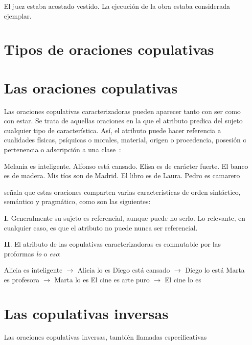 \pex[*]
\a	El juez estaba acostado vestido.
\a	La ejecución de la obra estaba considerada ejemplar.
\xe

\section{Tipos de oraciones copulativas}


\section{Las oraciones copulativas}

Las oraciones copulativas caracterizadoras pueden aparecer tanto con ser como con estar. Se trata de aquellas oraciones en la que el atributo predica del sujeto cualquier tipo de característica. Así, el atributo puede hacer referencia a cualidades físicas, psíquicas o morales, material, origen o procedencia, posesión o pertenencia o adscripción a una clase~\parencites[][]{Leborans1999Predicacion}[][]{Bentley20179Copular-and-}:

\pex
\a Melania es inteligente.
\a Alfonso está cansado.
\a Elisa es de carácter fuerte.
\a El banco es de madera.
\a Mis tíos son de Madrid.
\a El libro es de Laura.
\a Pedro es camarero
\xe



{}\textcite{Leborans1999Predicacion} señala que estas oraciones comparten varias características de orden sintáctico, semántico y pragmático, como son las siguientes:


\textbf{I}. Generalmente su sujeto es referencial, aunque puede no serlo. Lo relevante, en cualquier caso, es que el atributo no puede nunca ser referencial.

\textbf{II}. El atributo de las copulativas caracterizadoras es conmutable por las proformas \textit{lo} o \textit{eso}:

\pex
\a Alicia es inteligente $\longrightarrow$ Alicia lo es
\a Diego está cansado $\longrightarrow$ Diego lo está
\a Marta es profesora $\longrightarrow$ Marta lo es
\a El cine es arte puro $\longrightarrow$ El cine lo es
\xe




\section{Las copulativas inversas}

Las oraciones copulativas inversas, también llamadas especificativas 

